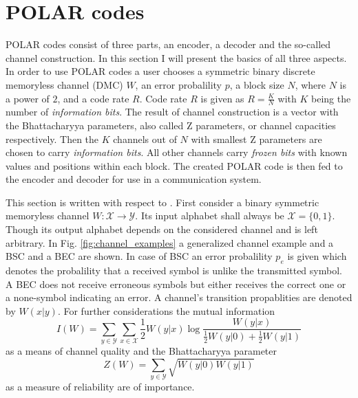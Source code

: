 \documentclass[a4paper,12pt]{scrartcl}
\begin{document}
\section{POLAR codes}
POLAR codes consist of three parts, an encoder, a decoder and the so-called channel construction.
In this section I will present the basics of all three aspects.
In order to use POLAR codes a user chooses a symmetric binary discrete memoryless channel (DMC) $W$, an error probalility $p$, a block size $N$, where $N$ is a power of $2$, and a code rate $R$.
Code rate $R$ is given as $R = \frac{K}{N}$ with $K$ being the number of \textit{information bits}.
The result of channel construction is a vector with the Bhattacharyya parameters, also called Z parameters, or channel capacities respectively.
Then the $K$ channels out of $N$ with smallest Z parameters are chosen to carry \textit{information bits}.
All other channels carry \textit{frozen bits} with known values and positions within each block.
The created POLAR code is then fed to the encoder and decoder for use in a communication system.

This section is written with respect to \cite{polar:arikan09}.
First consider a binary symmetric memoryless channel $W: \mathcal{X} \rightarrow \mathcal{Y}$.
Its input alphabet shall always be $\mathcal{X} = \{0, 1\}$.
Though its output alphabet depends on the considered channel and is left arbitrary.
In Fig. \ref{fig:channel_examples} a generalized channel example and a BSC and a BEC are shown.
In case of BSC an error probalility $p_e$ is given which denotes the probalility that a received symbol is unlike the transmitted symbol.
A BEC does not receive erroneous symbols but either receives the correct one or a none-symbol indicating an error.
A channel's transition propablities are denoted by $W(x|y)$.
For further considerations the mutual information
\begin{equation}
 I(W) = \sum_{y \in \mathcal{Y}} \sum_{x \in \mathcal{X}} \frac{1}{2} W(y|x) \log \frac{W(y|x)}{\frac{1}{2} W(y|0) + \frac{1}{2} W(y|1)}
\end{equation}
as a means of channel quality and the Bhattacharyya parameter
\begin{equation}
 Z(W) = \sum_{y \in \mathcal{Y}} \sqrt{W(y|0) W(y|1)}
\end{equation}
as a measure of reliability are of importance.
\end{document}
